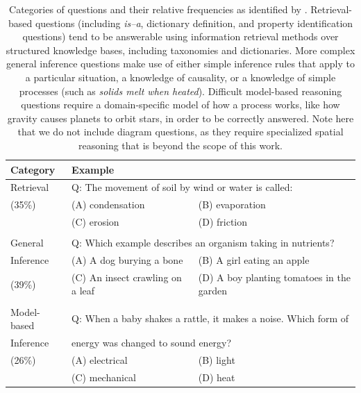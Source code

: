\begin{table}[t]
\begin{center}
\small
\begin{tabularx}{\textwidth}{p{2.5cm}p{5.2cm}p{5.9cm}}
\hline
Category &	\multicolumn{2}{l}{Example} \\
\hline
Retrieval	&	\multicolumn{2}{l}{Q: The movement of soil by wind or water is called:} \\
(35\%)		&   (A) condensation   	&	(B) evaporation   \\
			&	(C) erosion   		&	(D) friction \\
\\
General 	&	\multicolumn{2}{l}{Q: Which example describes an organism taking in nutrients?} \\
Inference	&   (A) A dog burying a bone			&   (B) A girl eating an apple	\\
(39\%)		&	(C) An insect crawling on a leaf	&  (D) A boy planting tomatoes in the garden  \\
\\
Model-based & 	\multicolumn{2}{l}{Q: When a baby shakes a rattle, it makes a noise. Which form of} \\
Inference	& 	\multicolumn{2}{l}{energy was changed to sound energy?} \\
(26\%)		&	(A) electrical	&   (B) light   \\
			&	(C) mechanical	&   (D) heat  \\
			
\end{tabularx}
\caption{ 
Categories of questions and their relative frequencies as identified by \citet{clark:2013}. Retrieval-based questions (including \emph{is--a}, dictionary definition, and property identification questions) tend to be answerable using information retrieval methods over structured knowledge bases, including taxonomies and dictionaries. 
More complex general inference questions make use of either simple inference rules that apply to a particular situation, a knowledge of causality, or a knowledge of simple processes (such as \emph{solids melt when heated}).
Difficult model-based reasoning questions require a domain-specific model of how a process works, like how gravity causes planets to orbit stars, in order to be correctly answered.
Note here that we do not include diagram questions, as they require specialized spatial reasoning that is beyond the scope of this work. }
\label{tab:inferenceexamples}
\end{center}
\end{table}

